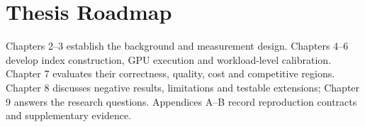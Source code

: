 \section{Thesis Roadmap}
\label{sec:1-6}
Chapters 2--3 establish the background and measurement design.
Chapters 4--6 develop index construction, GPU execution and workload-level
calibration. Chapter 7 evaluates their correctness, quality, cost and
competitive regions. Chapter 8 discusses negative results, limitations
and testable extensions; Chapter 9 answers the research questions.
Appendices A--B record reproduction contracts and supplementary evidence.
